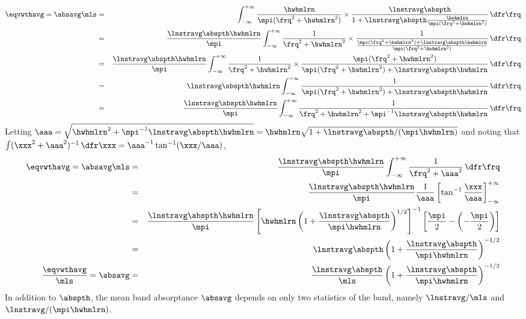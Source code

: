 \documentclass[12pt]{article}
\begin{document}
\begin{eqnarray}
\eqvwthavg = \absavg \mls 
& = & 
\int_{-\infty}^{+\infty} 
\frac{\hwhmlrn}{\mpi (\frq^{2} + \hwhmlrn^{2})} \times
\frac{\lnstravg \abspth}{1 + \lnstravg \abspth 
\frac{\hwhmlrn}{\mpi ( \frq^{2} + \hwhmlrn^{2} )}}
\,\dfr\frq \nonumber \\
& = & 
\frac{\lnstravg \abspth \hwhmlrn}{\mpi}
\int_{-\infty}^{+\infty} 
\frac{1}{\frq^{2} + \hwhmlrn^{2}} \times
\frac{1}{\frac{\mpi ( \frq^{2} + \hwhmlrn^{2} ) + 
\lnstravg \abspth \hwhmlrn}{\mpi ( \frq^{2} + \hwhmlrn^{2} )}}
\,\dfr\frq \nonumber \\
& = & 
\frac{\lnstravg \abspth \hwhmlrn}{\mpi}
\int_{-\infty}^{+\infty} 
\frac{1}{\frq^{2} + \hwhmlrn^{2}} \times
\frac{\mpi ( \frq^{2} + \hwhmlrn^{2} )}{\mpi ( \frq^{2} + \hwhmlrn^{2} ) + 
\lnstravg \abspth \hwhmlrn}
\,\dfr\frq \nonumber \\
& = & 
\lnstravg \abspth \hwhmlrn
\int_{-\infty}^{+\infty} 
\frac{1}{\mpi ( \frq^{2} + \hwhmlrn^{2} ) + 
\lnstravg \abspth \hwhmlrn}
\,\dfr\frq \nonumber \\
& = & 
\frac{\lnstravg \abspth \hwhmlrn}{\mpi}
\int_{-\infty}^{+\infty} 
\frac{1}{\frq^{2} + \hwhmlrn^{2} + \mpi^{-1} \lnstravg \abspth \hwhmlrn}
\,\dfr\frq \nonumber \\
\label{eqn:abs_xpn_lrn1}
\end{eqnarray}
Letting 
$\aaa = \sqrt{\hwhmlrn^{2} + \mpi^{-1} \lnstravg \abspth \hwhmlrn}
= \hwhmlrn \sqrt{1 + \lnstravg \abspth /(\mpi \hwhmlrn)}$ 
and noting that 
$\int (\xxx^{2} + \aaa^{2})^{-1} \,\dfr\xxx = \aaa^{-1} \tan^{-1} (\xxx/\aaa)$,
\begin{eqnarray}
\eqvwthavg = \absavg \mls 
& = & 
\frac{\lnstravg \abspth \hwhmlrn}{\mpi}
\int_{-\infty}^{+\infty} \frac{1}{\frq^{2} + \aaa^{2}}
\,\dfr\frq \nonumber \\
& = & 
\frac{\lnstravg \abspth \hwhmlrn}{\mpi}
\frac{1}{\aaa} \left[ \tan^{-1} \frac{\xxx}{\aaa}
\right]_{-\infty}^{+\infty} \nonumber \\
& = & 
\frac{\lnstravg \abspth \hwhmlrn}{\mpi}
\left[ \hwhmlrn \left(1 + \frac{\lnstravg \abspth}{\mpi \hwhmlrn} \right)^{1/2} \right]^{-1} 
\left[ \frac{\mpi}{2} - \left(-\frac{\mpi}{2} \right) \right] \nonumber \\
& = & 
\lnstravg \abspth
\left(1 + \frac{\lnstravg \abspth}{\mpi \hwhmlrn} \right)^{-1/2}
\nonumber \\
\frac{\eqvwthavg}{\mls} = \absavg 
& = & 
\frac{\lnstravg \abspth}{\mls}
\left(1 + \frac{\lnstravg \abspth}{\mpi \hwhmlrn} \right)^{-1/2}
\label{eqn:abs_xpn_lrn}
\end{eqnarray}
In addition to $\abspth$, the mean band absorptance $\absavg$ 
depends on only two statistics of the band, namely $\lnstravg/\mls$
and $\lnstravg/(\mpi \hwhmlrn)$.
\end{document}
